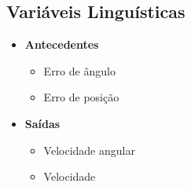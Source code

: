     \subsection{Variáveis Linguísticas}
        \begin{itemize}
            \item{\bf{Antecedentes}}
                \begin{itemize}
                    \item Erro de ângulo
                    \item Erro de posição
                \end{itemize}
            \item{\bf{Saídas}}
                \begin{itemize}
                        \item Velocidade angular
                        \item Velocidade
                \end{itemize}
        \end{itemize}
